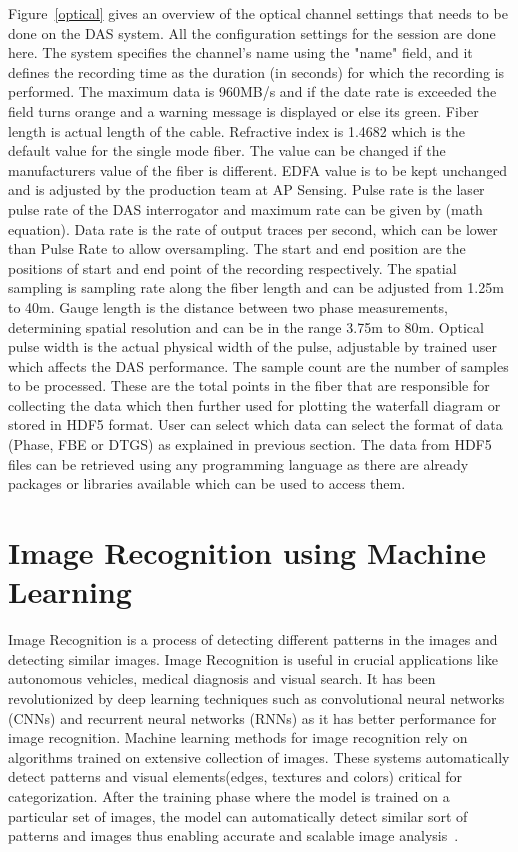 Figure~\ref{optical} gives an overview of the optical channel settings that needs to be done on the DAS system. All the configuration settings for the session are done here. The system specifies the channel's name using the "name" field, and it defines the recording time as the duration (in seconds) for which the recording is performed. The maximum data is 960MB/s and if the date rate is exceeded the field turns orange and a warning message is displayed or else its green. Fiber length is actual length of the cable. Refractive index is 1.4682 which is the default value for the single mode fiber. The value can be changed if the manufacturers value of the fiber is different. EDFA value is to be kept unchanged and is adjusted by the production team at AP Sensing. Pulse rate is the laser pulse rate of the DAS interrogator and maximum rate can be given by (math equation). Data rate is the rate of output traces per second, which can be lower than Pulse Rate to allow oversampling. The start and end position are the positions of start and end point of the recording respectively. The spatial sampling is sampling rate along the fiber length and can be adjusted from 1.25m to 40m. Gauge length is the distance between two phase measurements, determining spatial resolution and can be in the range 3.75m to 80m. Optical pulse width is the actual physical width of the pulse, adjustable by trained user which affects the DAS performance. The sample count are the number of samples to be processed. These are the total points in the fiber that are responsible for collecting the data which then further used for plotting the waterfall diagram or stored in HDF5 format. User can select which data can select the format of data (Phase, FBE or DTGS) as explained in previous section. The data from HDF5 files can be retrieved using any programming language as there are already packages or libraries available which can be used to access them. 

\section{Image Recognition using Machine Learning}
Image Recognition is a process of detecting different patterns in the images and detecting similar images. Image Recognition is useful in crucial applications like autonomous vehicles, medical diagnosis and visual search. It has been revolutionized by deep learning techniques such as convolutional neural networks (CNNs) and recurrent neural networks (RNNs) as it has better performance for image recognition. Machine learning methods for image recognition rely on algorithms trained on extensive collection of images. These systems automatically detect patterns and visual elements(edges, textures and colors) critical for categorization. After the training phase where the model is trained on a particular set of images, the model can automatically detect similar sort of patterns and images thus enabling accurate and scalable image analysis~\cite{chandni}. 

